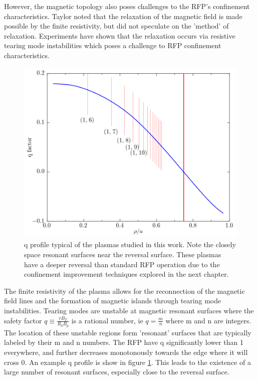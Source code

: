 \begin{refsection}
However, the magnetic topology also poses challenges to the RFP's confinement characteristics. Taylor noted that the relaxation of the magnetic field is made possible by the finite resistivity, but did not speculate on the 'method' of
relaxation. Experiments have shown that the relaxation occurs via resistive tearing mode instabilities which poses a challenge to RFP confinement characteristics.

\begin{figure}
	\centering
    \includegraphics[width = 1.\linewidth]{./1_Introduction/PPCD_q_profile.png}
    \caption[Example RPF q profile]{q profile typical of the plasmas studied in this work. Note the closely space resonant surfaces near the reversal surface. These plasmas have a deeper reversal than standard RFP operation due to the confinement improvement techniques explored in the next chapter.}
    \label{fig:q_profile}
\end{figure}

The finite resistivity of the plasma allows for the reconnection of the magnetic field lines and the formation of magnetic islands through tearing mode instabilities. Tearing modes are unstable at magnetic resonant surfaces where the safety factor $q \equiv \frac{rB_T}{R_0B_p}$ is a rational number, ie $q = \frac{m}{n}$ where m and n are integers. The location of these unstable regions
form 'resonant' surfaces that are typically labeled by their m and n numbers. The RFP have q significantly lower than 1 everywhere, and further decreases monotonously towards the edge where it will cross 0. An example q profile is show in figure \ref{fig:q_profile}. This leads to the existence of a large number of resonant surfaces, especially close to the reversal surface. 


\end{refsection}

